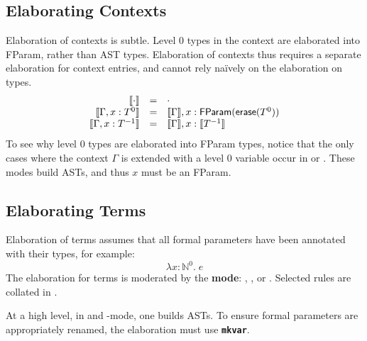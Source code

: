 \subsection{Elaborating Contexts}
Elaboration of contexts is subtle. Level $0$ types in the context are elaborated into \textsf{FParam}, rather than \textsf{AST} types. Elaboration of contexts thus requires a separate elaboration for context entries, and cannot rely naïvely on the elaboration on types.
\[
\begin{array}{rcl}
  \llbracket \cdot \rrbracket & = & \cdot \\
  \llbracket \Gamma, x:T^0 \rrbracket & = & \llbracket \Gamma \rrbracket, x: \textsf{FParam}(\textsf{erase}(T^0))\\
  \llbracket \Gamma, x:T^{-1} \rrbracket & = & \llbracket \Gamma \rrbracket, x: \llbracket T^{-1} \rrbracket
\end{array}
\]
To see why level $0$ types are elaborated into \textsf{FParam} types, notice that the only cases where the context $\Gamma$ is extended with a level $0$ variable occur in \compilemode{} or \quotemode{}. These modes build ASTs, and thus $x$ must be an \textsf{FParam}. 

\subsection{Elaborating Terms}
Elaboration of terms assumes that all formal parameters have been annotated with their types, for example: 
\[\lambda x: \mathbb{N}^0. \; e\]
The elaboration for terms is moderated by the \textbf{mode}: \compilemode{}, \quotemode{}, or \splicemode{}. Selected rules are collated in . 

At a high level, in \compilemode{} and \quotemode{}-mode, one builds ASTs. To ensure formal parameters are appropriately renamed, the elaboration must use \textbf{\texttt{mkvar}}. 

